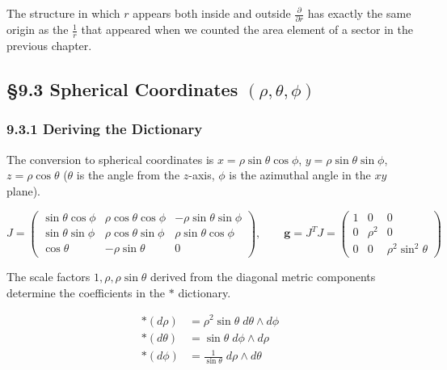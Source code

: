 \documentclass[a4paper,12pt,openany]{book}
\begin{document}
The structure in which \(r\) appears both inside and outside
\(\frac{\partial}{\partial r}\) has exactly the same origin as the
\(\frac{1}{r}\) that appeared when we counted the area element of a
sector in the previous chapter.

\par\vspace{0.35em}\par

\hypertarget{spherical-coordinates-rhothetaphi}{%
\subsection{\texorpdfstring{§9.3 Spherical Coordinates
\((\rho,\theta,\phi)\)}{§9.3 Spherical Coordinates (\textbackslash rho,\textbackslash theta,\textbackslash phi)}}\label{spherical-coordinates-rhothetaphi}}

\hypertarget{deriving-the-dictionary-1}{%
\subsubsection{9.3.1 Deriving the
Dictionary}\label{deriving-the-dictionary-1}}

The conversion to spherical coordinates is
\(x = \rho\sin\theta\cos\phi\), \(y = \rho\sin\theta\sin\phi\),
\(z = \rho\cos\theta\) (\(\theta\) is the angle from the \(z\)-axis,
\(\phi\) is the azimuthal angle in the \(xy\) plane).

\[J = \begin{pmatrix}
\sin\theta\cos\phi & \rho\cos\theta\cos\phi & -\rho\sin\theta\sin\phi \\
\sin\theta\sin\phi & \rho\cos\theta\sin\phi & \rho\sin\theta\cos\phi \\
\cos\theta & -\rho\sin\theta & 0
\end{pmatrix},\qquad
\mathbf{g} = J^T J = \begin{pmatrix}
1 & 0 & 0 \\
0 & \rho^2 & 0 \\
0 & 0 & \rho^2\sin^2\theta
\end{pmatrix}\]

The scale factors \(1, \rho, \rho\sin\theta\) derived from the diagonal
metric components determine the coefficients in the \(\ast\) dictionary.

\[\begin{aligned}
\ast(d\rho) &= \rho^2\sin\theta\; d\theta \wedge d\phi \\
\ast(d\theta) &= \sin\theta\; d\phi \wedge d\rho \\
\ast(d\phi) &= \frac{1}{\sin\theta}\; d\rho \wedge d\theta
\end{aligned}\]
\end{document}
